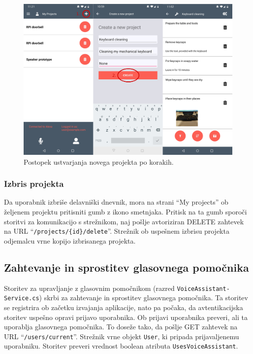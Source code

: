 \documentclass[a4paper, 12pt]{book}
\begin{document}
\begin{figure}[H]
\begin{center}
\includegraphics[width=13cm]{app_newproject}
\end{center}
	\caption{Postopek ustvarjanja novega projekta po korakih.}
\label{app_newproject}
\end{figure}

\subsubsection{Izbris projekta}

Da uporabnik izbriše delavniški dnevnik, mora na strani \enquote{My projects} ob željenem projektu pritisniti gumb z ikono smetnjaka.
Pritisk na ta gumb sporoči storitvi za komunikacijo s strežnikom, naj pošlje avtoriziran DELETE zahtevek na URL \enquote{\texttt{/projects/\{id\}/delete}}.
Strežnik ob uspešnem izbrisu projekta odjemalcu vrne kopijo izbrisanega projekta.

\subsection{Zahtevanje in sprostitev glasovnega pomočnika}
Storitev za upravljanje z glasovnim pomočnikom (razred \texttt{VoiceAssistant-\\Service.cs}) skrbi za zahtevanje in sprostitev glasovnega pomočnika.
Ta storitev se registrira ob začetku izvajanja aplikacije, nato pa počaka, da avtentikacijska storitev uspešno opravi prijavo uporabnika.
Ob prijavi uporabnika preveri, ali ta uporablja glasovnega pomočnika.
To doseže tako, da pošlje GET zahtevek na URL \enquote{\texttt{/users/current}}.
Strežnik vrne objekt \texttt{User}, ki pripada prijavaljenemu uporabniku.
Storitev preveri vrednost boolean atributa \texttt{UsesVoiceAssistant}.
\end{document}

